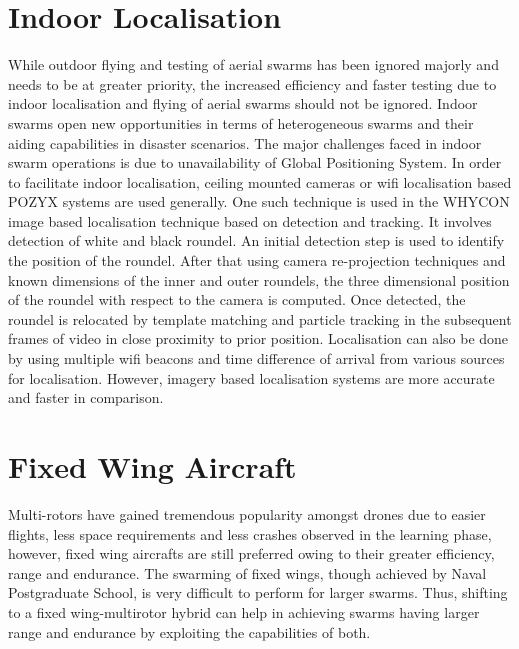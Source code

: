 \doublespacing
\section{Indoor Localisation}
While outdoor flying and testing of aerial swarms has been ignored majorly and
needs to be at greater priority, the increased efficiency and faster testing due to indoor
localisation and flying of aerial swarms should not be ignored. Indoor swarms open
new opportunities in terms of heterogeneous swarms and their aiding capabilities in
disaster scenarios. The major challenges faced in indoor swarm operations is due to
unavailability of Global Positioning System. In order to facilitate indoor localisation,
ceiling mounted cameras or wifi localisation based POZYX systems are used
generally.
One such technique is used in the WHYCON image based localisation technique
based on detection and tracking. It involves detection of white and black roundel. An
initial detection step is used to identify the position of the roundel. After that using
camera re-projection techniques and known dimensions of the inner and outer
roundels, the three dimensional position of the roundel with respect to the camera is
computed. Once detected, the roundel is relocated by template matching and particle
tracking in the subsequent frames of video in close proximity to prior position. \cite{nitsche2015whycon} 
Localisation can also be done by using multiple wifi beacons and time difference of arrival from
various sources for localisation.\cite{yang2015wifi}
However, imagery based localisation systems are more accurate and faster in
comparison.
\section{Fixed Wing Aircraft}
Multi-rotors have gained tremendous popularity amongst drones due to easier
flights, less space requirements and less crashes observed in the learning phase,
however, fixed wing aircrafts are still preferred owing to their greater efficiency,
range and endurance. The swarming of fixed wings, though achieved by Naval
Postgraduate School,\cite{nps}
is very difficult to perform for larger swarms. Thus, shifting
to a fixed wing-multirotor hybrid can help in achieving swarms having larger range
and endurance by exploiting the capabilities of both.